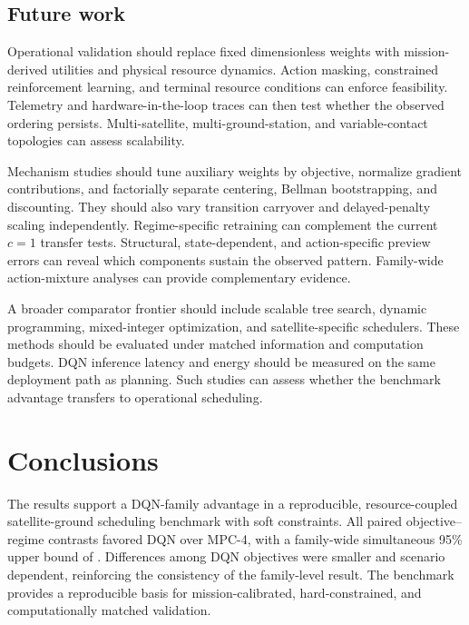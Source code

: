 \documentclass[remotesensing,article,submit,moreauthors]{Definitions/mdpi}
\begin{document}
\subsection{Future work}

Operational validation should replace fixed dimensionless weights with mission-derived utilities and physical resource dynamics. Action masking, constrained reinforcement learning, and terminal resource conditions can enforce feasibility. Telemetry and hardware-in-the-loop traces can then test whether the observed ordering persists. Multi-satellite, multi-ground-station, and variable-contact topologies can assess scalability.

Mechanism studies should tune auxiliary weights by objective, normalize gradient contributions, and factorially separate centering, Bellman bootstrapping, and discounting. They should also vary transition carryover and delayed-penalty scaling independently. Regime-specific retraining can complement the current $c=1$ transfer tests. Structural, state-dependent, and action-specific preview errors can reveal which components sustain the observed pattern. Family-wide action-mixture analyses can provide complementary evidence.

A broader comparator frontier should include scalable tree search, dynamic programming, mixed-integer optimization, and satellite-specific schedulers. These methods should be evaluated under matched information and computation budgets. DQN inference latency and energy should be measured on the same deployment path as planning. Such studies can assess whether the benchmark advantage transfers to operational scheduling.

\section{Conclusions}

The results support a DQN-family advantage in a reproducible, resource-coupled satellite-ground scheduling benchmark with soft constraints. All \DQNvsMPCContrastCount{} paired objective--regime contrasts favored DQN over MPC-4, with a family-wide simultaneous 95\% upper bound of \DQNvsMPCGlobalUpperBound. Differences among DQN objectives were smaller and scenario dependent, reinforcing the consistency of the family-level result. The benchmark provides a reproducible basis for mission-calibrated, hard-constrained, and computationally matched validation.

\end{document}
